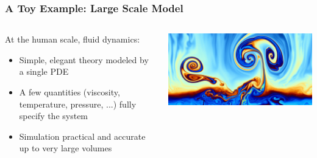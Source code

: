 \documentclass[aspectratio=169, 12pt]{beamer}
\begin{document}
\begin{frame}

    \frametitle{A Toy Example: Large Scale Model}

    \begin{columns}
        
    \begin{column}{.6\textwidth}
        At the human scale, fluid dynamics:

        \begin{itemize}
            \item Simple, elegant theory modeled by a single PDE
            \item A few quantities (viscosity, temperature, pressure, ...) fully specify the system
            \item Simulation practical and accurate up to very large volumes
        \end{itemize}

    \end{column}
    \begin{column}{.4\textwidth}
        \includegraphics[width=\textwidth]{images/fluid-dynamics.jpg}
    \end{column}
    \end{columns}

\end{frame}
\end{document}
